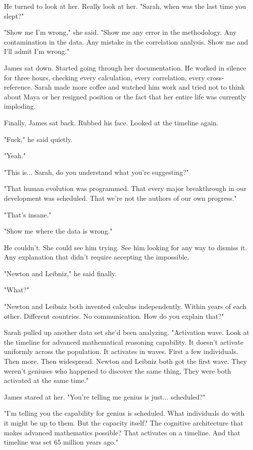 He turned to look at her. Really look at her. "Sarah, when was the last time you slept?"

"Show me I'm wrong," she said. "Show me any error in the methodology. Any contamination in the data. Any mistake in the correlation analysis. Show me and I'll admit I'm wrong."

James sat down. Started going through her documentation. He worked in silence for three hours, checking every calculation, every correlation, every cross-reference. Sarah made more coffee and watched him work and tried not to think about Maya or her resigned position or the fact that her entire life was currently imploding.

Finally, James sat back. Rubbed his face. Looked at the timeline again.

"Fuck," he said quietly.

"Yeah."

"This is... Sarah, do you understand what you're suggesting?"

"That human evolution was programmed. That every major breakthrough in our development was scheduled. That we're not the authors of our own progress."

"That's insane."

"Show me where the data is wrong."

He couldn't. She could see him trying. See him looking for any way to dismiss it. Any explanation that didn't require accepting the impossible.

"Newton and Leibniz," he said finally.

"What?"

"Newton and Leibniz both invented calculus independently. Within years of each other. Different countries. No communication. How do you explain that?"

Sarah pulled up another data set she'd been analyzing. "Activation wave. Look at the timeline for advanced mathematical reasoning capability. It doesn't activate uniformly across the population. It activates in waves. First a few individuals. Then more. Then widespread. Newton and Leibniz both got the first wave. They weren't geniuses who happened to discover the same thing. They were both activated at the same time."

James stared at her. "You're telling me genius is just... scheduled?"

"I'm telling you the capability for genius is scheduled. What individuals do with it might be up to them. But the capacity itself? The cognitive architecture that makes advanced mathematics possible? That activates on a timeline. And that timeline was set 65 million years ago."


